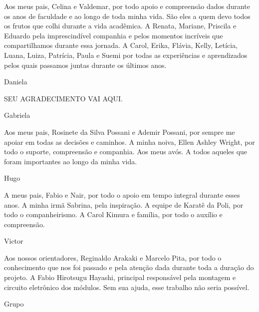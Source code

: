 Aos meus pais, Celina e Valdemar, por todo apoio e compreensão dados durante os anos de faculdade e ao longo de toda minha vida. São eles a quem devo todos os frutos que colhi durante a vida acadêmica.
A Renata, Mariane, Priscila e Eduardo pela imprescindível companhia e pelos momentos incríveis que compartilhamos durante essa jornada.
A Carol, Erika, Flávia, Kelly, Letícia, Luana, Luiza, Patrícia, Paula e Suemi por todas as experiências e aprendizados pelos quais passamos juntas durante os últimos anos.
\begin{flushright}
    Daniela
\end{flushright}

SEU AGRADECIMENTO VAI AQUI.
\begin{flushright}
    Gabriela
\end{flushright}

Aos meus pais, Rosinete da Silva Possani e Ademir Possani, por sempre me apoiar em todas as decisões e caminhos. A minha noiva, Ellen Ashley Wright, por todo o suporte, compreensão e companhia. Aos meus avós. A todos aqueles que foram importantes ao longo da minha vida.
\begin{flushright}
    Hugo
\end{flushright}

A meus pais, Fabio e Nair, por todo o apoio em tempo integral durante esses anos.
A minha irmã Sabrina, pela inspiração.
A equipe de Karatê da Poli, por todo o companheirismo.
A Carol Kimura e família, por todo o auxílio e compreensão.
\begin{flushright}
    Victor
\end{flushright}

Aos nossos orientadores, Reginaldo Arakaki e Marcelo Pita, por todo o conhecimento que nos foi passado e pela atenção dada durante toda a duração do projeto.
A Fabio Hirotsugu Hayashi, principal responsável pela montagem e circuito eletrônico dos módulos. Sem sua ajuda, esse trabalho não seria possível.
\begin{flushright}
    Grupo
\end{flushright}
